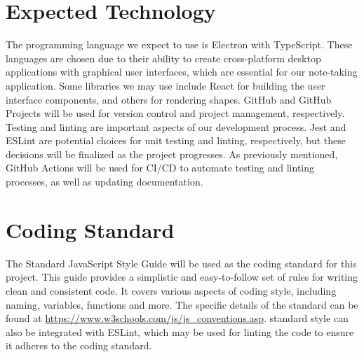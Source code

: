 \documentclass{article}
\begin{document}
\section{Expected Technology}



The programming language we expect to use is Electron with TypeScript. 
These languages are chosen due to their ability to create cross-platform 
desktop applications with graphical user interfaces, which are essential 
for our note-taking application. Some libraries we may use include React 
for building the user interface components, and others for rendering shapes.
 GitHub and GitHub Projects will be used for version control and 
project management, respectively. Testing and linting are important aspects
 of our development process. Jest and ESLint are potential choices 
for unit testing and linting, respectively, but these decisions will be 
finalized as the project progresses. As previously mentioned, GitHub 
Actions will be used for CI/CD to automate testing and linting processes,
 as well as updating documentation.

\section{Coding Standard}

The Standard JavaScript Style Guide will be used as the coding standard for
this project. This guide provides a simplistic and easy-to-follow set of 
rules for writing clean and consistent code. It covers various aspects
of coding style, including naming, variables, functions and more. The specific
details of the standard can be found at 
\url{https://www.w3schools.com/js/js_conventions.asp}. standard style can 
also be integrated with ESLint, which may be used for linting the code 
to ensure it adheres to the coding standard.
\end{document}

